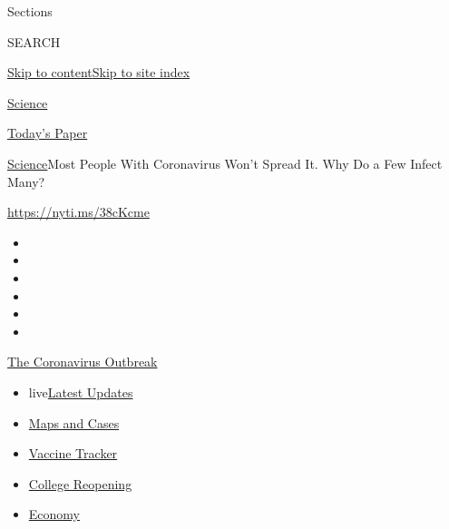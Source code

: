 Sections

SEARCH

\protect\hyperlink{site-content}{Skip to
content}\protect\hyperlink{site-index}{Skip to site index}

\href{https://www.nytimes3xbfgragh.onion/section/science}{Science}

\href{https://myaccount.nytimes3xbfgragh.onion/auth/login?response_type=cookie\&client_id=vi}{}

\href{https://www.nytimes3xbfgragh.onion/section/todayspaper}{Today's
Paper}

\href{/section/science}{Science}\textbar{}Most People With Coronavirus
Won't Spread It. Why Do a Few Infect Many?

\url{https://nyti.ms/38cKcme}

\begin{itemize}
\item
\item
\item
\item
\item
\item
\end{itemize}

\href{https://www.nytimes3xbfgragh.onion/news-event/coronavirus?action=click\&pgtype=Article\&state=default\&region=TOP_BANNER\&context=storylines_menu}{The
Coronavirus Outbreak}

\begin{itemize}
\tightlist
\item
  live\href{https://www.nytimes3xbfgragh.onion/2020/08/04/world/coronavirus-cases.html?action=click\&pgtype=Article\&state=default\&region=TOP_BANNER\&context=storylines_menu}{Latest
  Updates}
\item
  \href{https://www.nytimes3xbfgragh.onion/interactive/2020/us/coronavirus-us-cases.html?action=click\&pgtype=Article\&state=default\&region=TOP_BANNER\&context=storylines_menu}{Maps
  and Cases}
\item
  \href{https://www.nytimes3xbfgragh.onion/interactive/2020/science/coronavirus-vaccine-tracker.html?action=click\&pgtype=Article\&state=default\&region=TOP_BANNER\&context=storylines_menu}{Vaccine
  Tracker}
\item
  \href{https://www.nytimes3xbfgragh.onion/2020/08/02/us/covid-college-reopening.html?action=click\&pgtype=Article\&state=default\&region=TOP_BANNER\&context=storylines_menu}{College
  Reopening}
\item
  \href{https://www.nytimes3xbfgragh.onion/live/2020/08/04/business/stock-market-today-coronavirus?action=click\&pgtype=Article\&state=default\&region=TOP_BANNER\&context=storylines_menu}{Economy}
\end{itemize}

